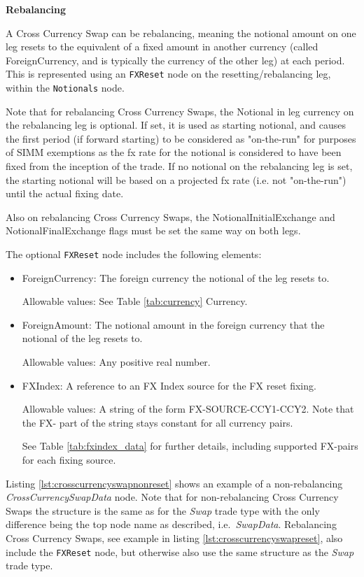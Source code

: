 {\bf Rebalancing

A Cross Currency Swap can be rebalancing, meaning the notional amount on one leg resets to the equivalent of a fixed amount in another currency (called ForeignCurrency, and is typically the currency of the other leg) at each period. This is represented using an \lstinline!FXReset! node on the resetting/rebalancing leg, within the \lstinline!Notionals! node. 

Note that for rebalancing Cross Currency Swaps, the Notional in leg currency on the rebalancing leg is optional. If set, it is used as starting notional, and causes the first period (if forward starting)  to be considered as "on-the-run" for purposes of SIMM exemptions as the fx rate for the notional is considered to have been fixed from the inception of the trade. If no notional on the rebalancing leg is set, the starting notional will be based on a projected fx rate (i.e. not "on-the-run") until the actual fixing date.

Also on rebalancing Cross Currency Swaps, the NotionalInitialExchange and NotionalFinalExchange flags must be set the same way on both legs.

The optional \lstinline!FXReset! node includes the following elements:

\begin{itemize}

\item ForeignCurrency: The foreign currency the notional of the leg resets to.  

Allowable values:  See Table \ref{tab:currency} Currency.

\item ForeignAmount: The notional amount in the foreign currency that the notional of the leg resets to.  

Allowable values:  Any positive real number.

\item FXIndex: A reference to an FX Index source for the FX reset fixing. 

Allowable values:  A string of the form FX-SOURCE-CCY1-CCY2. Note that the FX- part of the string stays constant for all currency pairs.

See Table \ref{tab:fxindex_data} for further details, including supported FX-pairs for each fixing source.

\end{itemize}

Listing \ref{lst:crosscurrencyswapnonreset} shows an example of a non-rebalancing \emph{CrossCurrencySwapData} node. Note that for non-rebalancing Cross Currency Swaps the structure is the same as for the \emph{Swap} trade type with the only difference being the top node name as described, i.e.\ \emph{SwapData}. Rebalancing Cross Currency Swaps, see example in listing \ref{lst:crosscurrencyswapreset}, also include the \lstinline!FXReset! node, but otherwise also use the same structure as the \emph{Swap} trade type.

}
